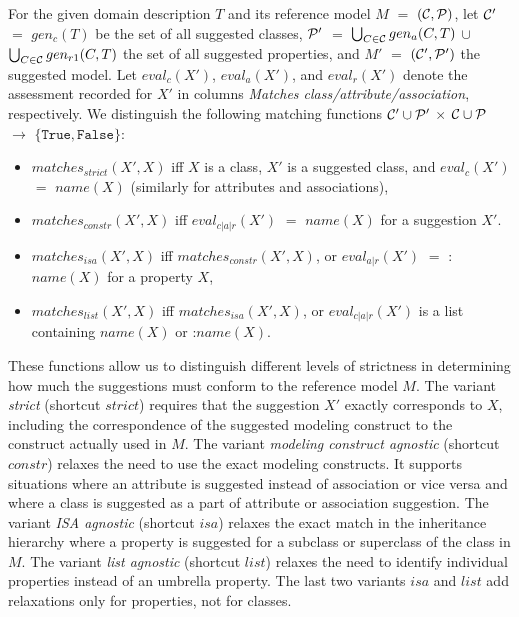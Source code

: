 For the given domain description $T$ and its reference model $M$ $=$ $({\cal C}, {\cal P})$, let ${\cal C}'$ $=$ $gen_c(T)$ be the set of all suggested classes, ${\cal P}'$ $=$ $\bigcup_{C \in {\cal C}} gen_a(C,T)$ $\cup$ $\bigcup_{C \in {\cal C}} gen_{r1}(C,T)$ the set of all suggested properties, and $M'$ $=$ $({\cal C'}, {\cal P}')$ the suggested model.
Let $eval_c(X')$, $eval_a(X')$, and $eval_r(X')$ denote the assessment recorded for $X'$ in columns \emph{Matches class/attribute/association}, respectively.
We distinguish the following matching functions ${\cal C}' \cup {\cal P}'$ $\times$ ${\cal C} \cup {\cal P}$ $\rightarrow$ $\{\mathtt{True}, \mathtt{False}\}$:
\begin{itemize}
    \item $matches_{strict}(X',X)$ iff $X$ is a class, $X'$ is a suggested class, and $eval_c(X')$ $=$ $name(X)$ (similarly for attributes and associations),
    \item $matches_{constr}(X',X)$ iff $eval_{c \vert a \vert r}(X')$ $=$ $name(X)$ for a suggestion $X'$.
    \item $matches_{isa}(X',X)$ iff $matches_{constr}(X',X)$, or $eval_{a \vert r}(X')$ $=$ :$name(X)$ for a property $X$,
    \item $matches_{list}(X',X)$ iff $matches_{isa}(X',X)$, or $eval_{c \vert a \vert r}(X')$ is a list containing $name(X)$ or :$name(X)$.
\end{itemize}

These functions allow us to distinguish different levels of strictness in determining how much the suggestions must conform to the reference model $M$.
The variant \emph{strict} (shortcut $strict$) requires that the suggestion $X'$ exactly corresponds to $X$, including the correspondence of the suggested modeling construct to the construct actually used in $M$.
The variant \emph{modeling construct agnostic} (shortcut $constr$) relaxes the need to use the exact modeling constructs.
It supports situations where an attribute is suggested instead of association or vice versa and where a class is suggested as a part of attribute or association suggestion.
The variant \emph{ISA agnostic} (shortcut $isa$) relaxes the exact match in the inheritance hierarchy where a property is suggested for a subclass or superclass of the class in $M$.
The variant \emph{list agnostic} (shortcut $list$) relaxes the need to identify individual properties instead of an umbrella property.
The last two variants $isa$ and $list$ add relaxations only for properties, not for classes.


